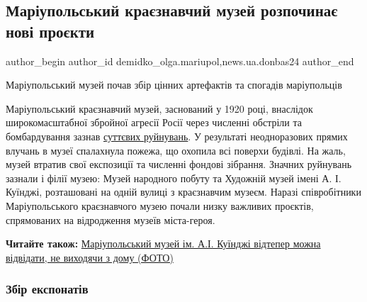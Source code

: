  
 
 
 
 
 
\subsection{Маріупольський краєзнавчий музей розпочинає нові проєкти}
\label{sec:14_06_2023.stz.news.ua.donbas24.1.mariupol_krajeznavchyj_muzej_novi_proekty}
 
\ifcmt
 author_begin
   author_id demidko_olga.mariupol,news.ua.donbas24
 author_end
\fi

\begin{qqquote}
Маріупольський музей почав збір цінних артефактів та спогадів маріупольців 
\end{qqquote}

Маріупольський краєзнавчий музей, заснований у 1920 році, внаслідок
широкомасштабної збройної агресії Росії через численні обстріли та
бомбардування зазнав
\href{https://donbas24.news/news/den-muzeyiv-yak-rosiyani-ruinuyut-kulturnu-spadshhinu-donbasu-foto}{суттєвих
руйнувань}. У результаті неодноразових прямих влучань в музеї спалахнула
пожежа, що охопила всі поверхи будівлі. На жаль, музей втратив свої експозиції
та численні фондові зібрання. Значних руйнувань зазнали і філії музею: Музей
народного побуту та Художній музей імені А. І.  Куїнджі, розташовані на одній
вулиці з краєзнавчим музеєм. Наразі співробітники Маріупольського краєзнавчого
музею почали низку важливих проєктів, спрямованих на відродження музеїв
міста-героя.

\textbf{Читайте також:} \href{https://donbas24.news/news/mariupolskii-muzei-im-ai-kuyindzi-vidteper-mozna-vidvidati-ne-vixodyaci-z-domu-foto}{Маріупольський музей ім. А.І. Куїнджі відтепер можна відвідати, не виходячи з дому (ФОТО)}

\subsubsection{Збір експонатів}

